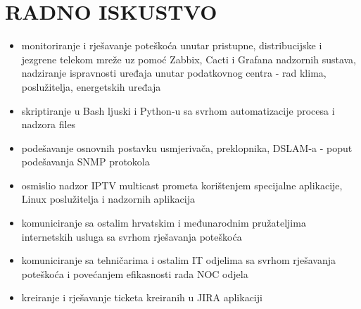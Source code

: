 \documentclass{cv}
\begin{document}
\section{RADNO ISKUSTVO}
\begin{itemize}
    \setlength\itemsep{0.1cm}
    \item monitoriranje i rješavanje poteškoća unutar pristupne, distribucijske i jezgrene telekom mreže uz pomoć Zabbix, Cacti i Grafana nadzornih sustava, nadziranje ispravnosti uređaja unutar podatkovnog centra - rad klima, poslužitelja, energetskih uređaja
    \item skriptiranje u Bash ljuski i Python-u sa svrhom automatizacije procesa i nadzora
files
    \item podešavanje osnovnih postavku usmjerivača, preklopnika, DSLAM-a - poput podešavanja SNMP protokola
    \item osmislio nadzor IPTV multicast prometa korištenjem specijalne aplikacije, Linux poslužitelja i nadzornih aplikacija
    \item komuniciranje sa ostalim hrvatskim i međunarodnim pružateljima internetskih usluga sa svrhom rješavanja poteškoća
    \item komuniciranje sa tehničarima i ostalim IT odjelima sa svrhom rješavanja poteškoća i povećanjem efikasnosti rada NOC odjela
    \item kreiranje i rješavanje ticketa kreiranih u JIRA aplikaciji
\end{itemize}
\end{document}
